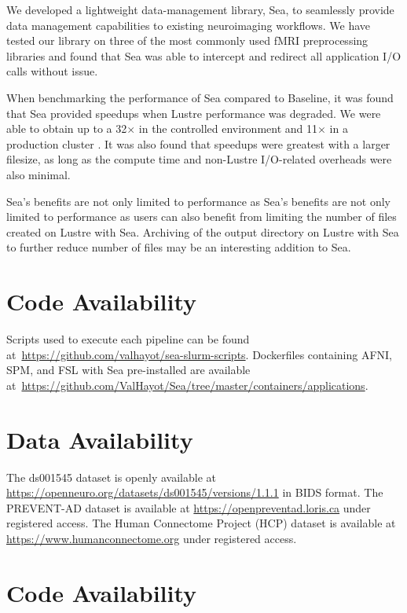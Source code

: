 \documentclass[fleqn,10pt]{wlscirep}
\newcommand{\TG}[1]{\todo[color=green!60!black]{\textbf{\textsc{From Tristan:}} #1\xspace}}
\begin{document}
    We developed a lightweight data-management library, Sea, to seamlessly
    provide data management capabilities to existing neuroimaging workflows. We
    have tested our library on three of the most commonly used fMRI
    preprocessing libraries and found that Sea was able to intercept and
    redirect all application I/O calls without issue. 

    When benchmarking the performance of Sea compared to Baseline, it was found that Sea provided speedups
    when Lustre performance was degraded. We were able to obtain up to a
    32$\times$ in the controlled environment and 11$\times$ in a production
    cluster \TG{Double check this number}. It was also found that speedups were greatest with a larger
    filesize, as long as the compute time and non-Lustre I/O-related overheads
    were also minimal.

     Sea's benefits are not only limited to performance as
     Sea's benefits are not only limited to performance as
    users can also benefit from limiting the number of files created on Lustre
    with Sea. Archiving of the output directory on Lustre with Sea to further
    reduce number of files may be an interesting addition to Sea.

    \section{Code Availability}

    Scripts used to
    execute each pipeline can be found
    at~\url{https://github.com/valhayot/sea-slurm-scripts}. 
    Dockerfiles containing AFNI, SPM, and FSL with Sea pre-installed are available
    at~\url{https://github.com/ValHayot/Sea/tree/master/containers/applications}.

    \section{Data Availability}

    The ds001545 dataset is openly available at \url{https://openneuro.org/datasets/ds001545/versions/1.1.1} in BIDS format.
    The PREVENT-AD dataset is available at \url{https://openpreventad.loris.ca} under registered access.
    The Human Connectome Project (HCP) dataset is available at \url{https://www.humanconnectome.org} under registered access.
    \section{Code Availability}
\end{document}
